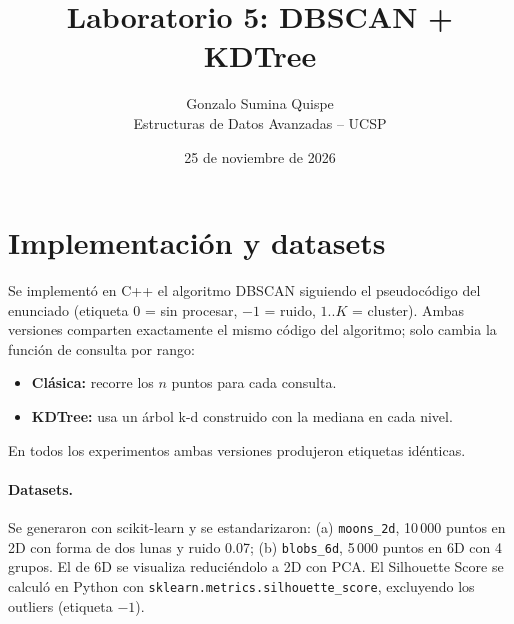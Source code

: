 \documentclass[11pt,a4paper]{article}
\title{Laboratorio 5: DBSCAN + KDTree}
\author{Gonzalo Sumina Quispe\\Estructuras de Datos Avanzadas -- UCSP}
\date{25 de noviembre de 2026}
\begin{document}
	\maketitle
	
	\section{Implementación y datasets}
	Se implementó en C++ el algoritmo DBSCAN siguiendo el pseudocódigo del enunciado (etiqueta $0$ = sin procesar, $-1$ = ruido, $1..K$ = cluster). Ambas versiones comparten exactamente el mismo código del algoritmo; solo cambia la función de consulta por rango:
	\begin{itemize}
		\item \textbf{Clásica:} recorre los $n$ puntos para cada consulta.
		\item \textbf{KDTree:} usa un árbol k-d construido con la mediana en cada nivel.
	\end{itemize}
	En todos los experimentos ambas versiones produjeron etiquetas idénticas.
	
	\paragraph{Datasets.} Se generaron con scikit-learn y se estandarizaron: (a) \texttt{moons\_2d}, 10\,000 puntos en 2D con forma de dos lunas y ruido 0.07; (b) \texttt{blobs\_6d}, 5\,000 puntos en 6D con 4 grupos. El de 6D se visualiza reduciéndolo a 2D con PCA. El Silhouette Score se calculó en Python con \texttt{sklearn.metrics.silhouette\_score}, excluyendo los outliers (etiqueta $-1$).
	
\end{document}
